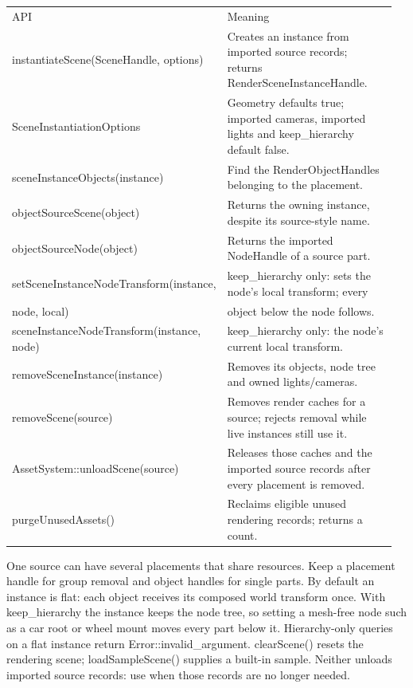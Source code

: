 \documentclass[11pt,a4paper]{article}
\begin{document}
{\small
\begin{longtable}{@{}p{0.42\linewidth}p{0.54\linewidth}@{}}
API & Meaning \\
instantiateScene(SceneHandle, options) & Creates an instance from imported source records; returns RenderSceneInstanceHandle. \\
SceneInstantiationOptions & Geometry defaults true; imported cameras, imported lights and keep\_hierarchy default false. \\
sceneInstanceObjects(instance) & Find the RenderObjectHandles belonging to the placement. \\
objectSourceScene(object) & Returns the owning instance, despite its source-style name. \\
objectSourceNode(object) & Returns the imported NodeHandle of a source part. \\
setSceneInstanceNodeTransform(instance, & keep\_hierarchy only: sets the node's local transform; every \\
node, local) & object below the node follows. \\
sceneInstanceNodeTransform(instance, node) & keep\_hierarchy only: the node's current local transform. \\
removeSceneInstance(instance) & Removes its objects, node tree and owned lights/cameras. \\
removeScene(source) & Removes render caches for a source; rejects removal while live instances still use it. \\
AssetSystem::unloadScene(source) & Releases those caches and the imported source records after every placement is removed. \\
purgeUnusedAssets() & Reclaims eligible unused rendering records; returns a count. \\
\end{longtable}
}

One source can have several placements that share resources. Keep a placement handle for group removal and object handles for single parts. By default an instance is flat: each object receives its composed world transform once. With keep\_hierarchy the instance keeps the node tree, so setting a mesh-free node such as a car root or wheel mount moves every part below it. Hierarchy-only queries on a flat instance return Error::invalid\_argument. clearScene() resets the rendering scene; loadSampleScene() supplies a built-in sample. Neither unloads imported source records: use  when those records are no longer needed.
\end{document}
